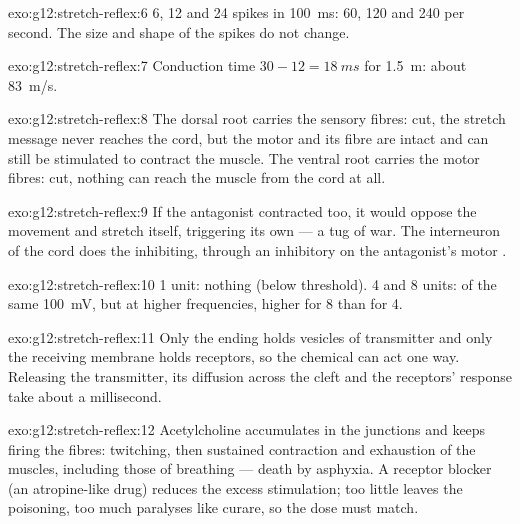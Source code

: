 \begin{solution}{exo:g12:stretch-reflex:6}
6, 12 and 24 spikes in \qty{100}{ms}: 60, 120 and 240 per second. The
size and shape of the spikes do not change.
\end{solution}

\begin{solution}{exo:g12:stretch-reflex:7}
Conduction time $30 - 12 = \qty{18}{ms}$ for \qty{1.5}{m}: about
\qty{83}{m/s}.
\end{solution}

\begin{solution}{exo:g12:stretch-reflex:8}
The dorsal root carries the sensory fibres: cut, the stretch message
never reaches the cord, but the motor  and its fibre are intact
and can still be stimulated to contract the muscle. The ventral root
carries the motor fibres: cut, nothing can reach the muscle from the
cord at all.
\end{solution}

\begin{solution}{exo:g12:stretch-reflex:9}
If the antagonist contracted too, it would oppose the movement and
stretch itself, triggering its own  --- a tug of war. The
interneuron of the cord does the inhibiting, through an inhibitory
 on the antagonist's motor .
\end{solution}

\begin{solution}{exo:g12:stretch-reflex:10}
1 unit: nothing (below threshold). 4 and 8 units: 
of the same \qty{100}{mV}, but at higher frequencies, higher for 8
than for 4.
\end{solution}

\begin{solution}{exo:g12:stretch-reflex:11}
Only the ending holds vesicles of transmitter and only the receiving
membrane holds receptors, so the chemical can act one way. Releasing
the transmitter, its diffusion across the cleft and the receptors'
response take about a millisecond.
\end{solution}

\begin{solution}{exo:g12:stretch-reflex:12}
Acetylcholine accumulates in the junctions and keeps firing the
fibres: twitching, then sustained contraction and exhaustion of the
muscles, including those of breathing --- death by asphyxia. A
receptor blocker (an atropine-like drug) reduces the excess
stimulation; too little leaves the poisoning, too much paralyses like
curare, so the dose must match.
\end{solution}

